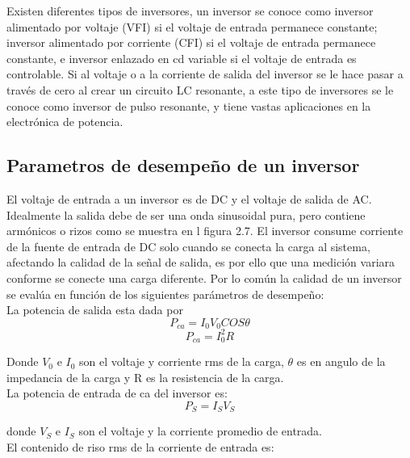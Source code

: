Existen diferentes tipos de inversores, un inversor se conoce como inversor alimentado por voltaje (VFI) si el voltaje de entrada permanece constante; inversor alimentado por corriente (CFI) si el voltaje de entrada permanece constante, e inversor enlazado en cd variable si el voltaje de entrada es controlable. Si al voltaje o a la corriente de salida del inversor se le hace pasar a través de cero al crear un circuito LC resonante, a este tipo de inversores se le conoce como inversor de pulso resonante, y tiene vastas aplicaciones en la electrónica de potencia. \\

\subsection{Parametros de desempeño de un inversor}

El voltaje de entrada a un inversor es de DC y el voltaje de salida de AC. Idealmente la salida debe de ser una onda sinusoidal pura, pero contiene armónicos o rizos como se muestra en l figura 2.7. El inversor consume corriente de la fuente de entrada de DC solo cuando se conecta la carga al sistema, afectando la calidad de la señal de salida, es por ello que una medición variara conforme se conecte una carga diferente. Por lo común la calidad de un inversor se evalúa en función de los siguientes parámetros de desempeño:\\

La potencia de salida esta dada por \begin{equation}
P_{ca}=I_{0}V_{0}COS\theta
\end{equation}
\begin{equation}
P_{ca}= I_{0}^{2}R
\end{equation}

Donde $V_{0}$ e $I_{0}$ son el voltaje y corriente rms de la carga, $\theta$ es en angulo de la impedancia de la carga y R es la resistencia de la carga.\\

La potencia de entrada de ca del inversor es:\\

\begin{equation}
P_{S}=I_{S}V_{S}
\end{equation}

donde $V_{S}$ e $I_{S}$ son el voltaje y la corriente promedio de entrada.\\

El contenido de riso rms de la corriente de entrada es:

